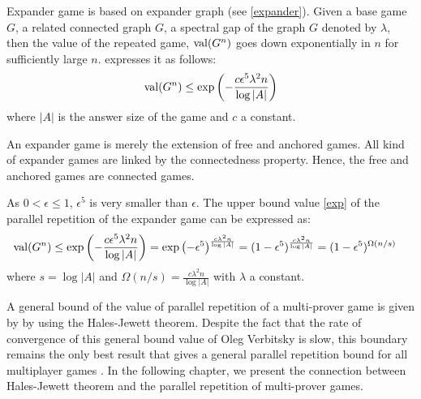 Expander game is based on expander graph (see \eqref{expander}).  Given a base game $G$, a related connected graph $G$, a spectral gap of the graph $G$ denoted by $\lambda$,  then the value of the repeated game, $\mathrm{val} (G^n)$  goes down exponentially in $n$ for sufficiently large $n$. \cite{dinur2016multiplayer} expresses it as follows:
\begin{align}
\mathrm{val} (G^n) \leq \exp \left(-\frac{c \epsilon^5 \lambda^2 n }{\log |A|}\right) \label{exp}
\end{align}
where $|A|$ is the answer size of the game and $c$ a constant.

An expander game is  merely the extension of free and anchored games. All kind of expander games are linked by the connectedness property. Hence, the free and anchored games are connected games. 

As $0 < \epsilon \leq 1$, $\epsilon^5$ is very smaller than $\epsilon$. The upper bound value \eqref{exp} of the parallel repetition of the expander game can be expressed as:
\begin{align*}
\mathrm{val} (G^n) & \leq \exp \left(-\frac{c \epsilon^5 \lambda^2 n }{\log |A|}\right) =\exp \left(-\epsilon^5\right)^{\frac{c  \lambda^2 n }{\log |A|}} =(1-\epsilon^5)^{ \frac{c  \lambda^2 n }{\log |A|}} =(1-\epsilon^5)^{ \Omega(n/s)}
\end{align*}
where $s=\log |A|$ and $\Omega(n/s)=\frac{c  \lambda^2 n }{\log |A|}$ with  $\lambda$ a constant.

A general bound of the value of parallel repetition of a multi-prover game is  given by  \cite{verbitsky1996towards} by using the Hales-Jewett theorem. Despite the fact that the rate of  convergence of this general bound value of Oleg Verbitsky is slow, this boundary  remains the only best result that gives a general parallel repetition bound for all multiplayer games \citep*{hkazla2016forbidden,dinur2016multiplayer}. In the following chapter, we present the connection between Hales-Jewett theorem and the parallel repetition of  multi-prover games. 

 
 